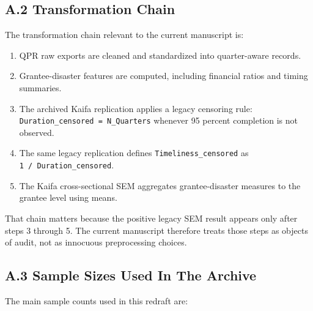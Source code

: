 \documentclass[
  letterpaper,
]{article}
\providecommand{\tightlist}{%
  \setlength{\itemsep}{0pt}\setlength{\parskip}{0pt}}
\begin{document}
\subsection{A.2 Transformation Chain}\label{a.2-transformation-chain}

The transformation chain relevant to the current manuscript is:

\begin{enumerate}
\def\labelenumi{\arabic{enumi}.}
\tightlist
\item
  QPR raw exports are cleaned and standardized into quarter-aware
  records.
\item
  Grantee-disaster features are computed, including financial ratios and
  timing summaries.
\item
  The archived Kaifa replication applies a legacy censoring rule:
  \texttt{Duration\_censored\ =\ N\_Quarters} whenever 95 percent
  completion is not observed.
\item
  The same legacy replication defines \texttt{Timeliness\_censored} as
  \texttt{1\ /\ Duration\_censored}.
\item
  The Kaifa cross-sectional SEM aggregates grantee-disaster measures to
  the grantee level using means.
\end{enumerate}

That chain matters because the positive legacy SEM result appears only
after steps 3 through 5. The current manuscript therefore treats those
steps as objects of audit, not as innocuous preprocessing choices.

\subsection{A.3 Sample Sizes Used In The
Archive}\label{a.3-sample-sizes-used-in-the-archive}

The main sample counts used in this redraft are:
\end{document}
